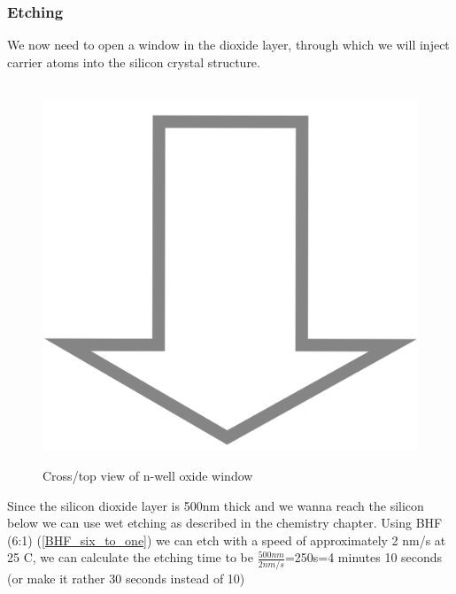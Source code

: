 \subsubsection{Etching}
We now need to open a window in the dioxide layer, through which we will inject carrier atoms into the silicon crystal structure.
\begin{figure}[H]
	\centering
	\begin{tikzpicture}[node distance = 3cm, auto, thick,scale=\CrossAndTopSection, every node/.style={transform shape}]
		
	\end{tikzpicture}
	\begin{tikzpicture}[node distance = 3cm, auto, thick,scale=\CrossAndTopSection, every node/.style={transform shape}]
		
	\end{tikzpicture} \\
	\includegraphics[scale=0.01]{down_arrow.png} \\
	\begin{tikzpicture}[node distance = 3cm, auto, thick,scale=\CrossAndTopSection, every node/.style={transform shape}]
		
	\end{tikzpicture}
	\begin{tikzpicture}[node distance = 3cm, auto, thick,scale=\CrossAndTopSection, every node/.style={transform shape}]
		
	\end{tikzpicture}
	\caption{Cross/top view of n-well oxide window}
\end{figure}
Since the silicon dioxide layer is 500nm thick and we wanna reach the silicon below we can use wet etching as described in the chemistry chapter.
Using BHF (6:1) (\autoref{BHF_six_to_one}) we can etch with a speed of approximately 2 nm/s at 25 \degree C, we can calculate the etching time to be $\frac{500nm}{2nm/s}$=250s=4 minutes 10 seconds (or make it rather 30 seconds instead of 10)

